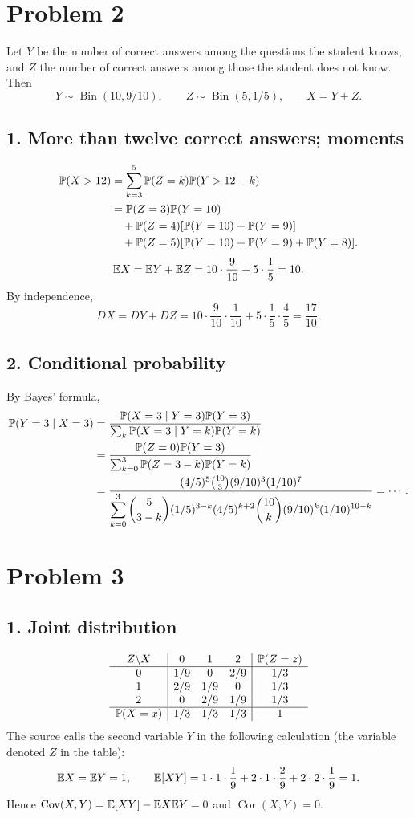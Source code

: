 \documentclass[11pt,a4paper]{article}
\begin{document}
\section*{Problem 2}
Let $Y$ be the number of correct answers among the questions the student knows, and $Z$ the number of correct answers among those the student does not know. Then
\[
Y\sim\operatorname{Bin}(10,9/10),\qquad
Z\sim\operatorname{Bin}(5,1/5),\qquad X=Y+Z.
\]
\subsection*{1. More than twelve correct answers; moments}
\begin{align*}
\P(X>12)&=\sum_{k=3}^5\P(Z=k)\P(Y>12-k)\\
&=\P(Z=3)\P(Y=10)\\
&\quad+\P(Z=4)[\P(Y=10)+\P(Y=9)]\\
&\quad+\P(Z=5)[\P(Y=10)+\P(Y=9)+\P(Y=8)].
\end{align*}
\[
\E X=\E Y+\E Z=10\cdot\frac9{10}+5\cdot\frac15=10.
\]
By independence,
\[
DX=DY+DZ=10\cdot\frac9{10}\cdot\frac1{10}
+5\cdot\frac15\cdot\frac45=\frac{17}{10}.
\]
\subsection*{2. Conditional probability}
By Bayes' formula,
\begin{align*}
\P(Y=3\mid X=3)
&=\frac{\P(X=3\mid Y=3)\P(Y=3)}
{\sum_k\P(X=3\mid Y=k)\P(Y=k)}\\
&=\frac{\P(Z=0)\P(Y=3)}{\sum_{k=0}^3\P(Z=3-k)\P(Y=k)}\\
&=\frac{(4/5)^5\binom{10}3(9/10)^3(1/10)^7}
{\displaystyle\sum_{k=0}^3\binom5{3-k}(1/5)^{3-k}(4/5)^{k+2}
\binom{10}k(9/10)^k(1/10)^{10-k}}=\cdots.
\end{align*}

\section*{Problem 3}
\subsection*{1. Joint distribution}
\[
\begin{array}{c|ccc|c}
Z\backslash X&0&1&2&\P(Z=z)\\\hline
0&1/9&0&2/9&1/3\\
1&2/9&1/9&0&1/3\\
2&0&2/9&1/9&1/3\\\hline
\P(X=x)&1/3&1/3&1/3&1
\end{array}
\]
The source calls the second variable $Y$ in the following calculation (the variable denoted $Z$ in the table):
\[
\E X=\E Y=1,\qquad
\E[XY]=1\cdot1\cdot\frac19+2\cdot1\cdot\frac29+2\cdot2\cdot\frac19=1.
\]
Hence $\operatorname{Cov}(X,Y)=\E[XY]-\E X\E Y=0$ and $\operatorname{Cor}(X,Y)=0$.
\end{document}
